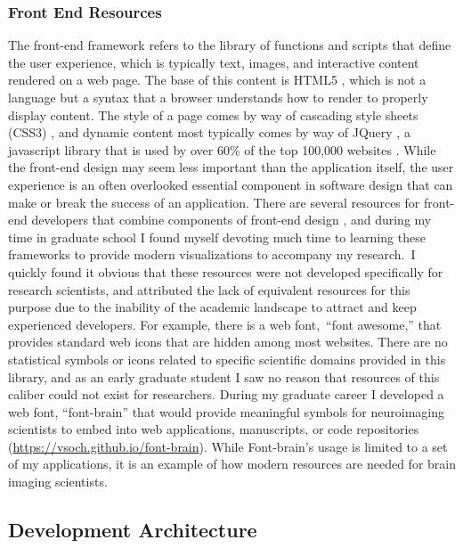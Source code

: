 \documentclass{report}
\begin{document}
\subsubsection{Front End Resources}

The front-end framework refers to the library of functions and scripts
that define the user experience, which is typically text, images, and
interactive content rendered on a web page. The base of this content is
HTML5 \cite{noauthor_undated-ov},
which is not a language but a syntax that a browser understands how to
render to properly display content. The style of a page comes by way of
cascading style sheets (CSS3) \cite{noauthor_undated-qj},
and dynamic content most typically comes by way of JQuery \cite{Foundation-jqueryorg_undated-ra},
a javascript library that is used by over 60\% of the top 100,000
websites \cite{Foundation-jqueryorg_undated-jc}.
While the front-end design may seem less important than the application
itself, the user experience is an often overlooked essential component
in software design that can make or break the success of an application.
There are several resources for front-end developers that combine
components of front-end design \cite{Gandy_undated-mp,noauthor_undated-yt,Mark_Otto_Jacob_Thornton_and_Bootstrap_contributors_undated-is},
and during my time in graduate school I found myself devoting much time
to learning these frameworks to provide modern visualizations to
accompany my research.~I quickly found it obvious that these resources
were not developed specifically for research scientists, and attributed
the lack of equivalent resources for this purpose due to the inability
of the academic landscape to attract and keep experienced developers.
For example, there is a web font,~``font awesome,'' that provides
standard web icons that are hidden among most websites. There are no
statistical symbols or icons related to specific scientific domains
provided in this library, and as an early graduate student I saw no
reason that resources of this caliber could not exist for researchers.
During my graduate career I developed a web font, ``font-brain'' that
would provide meaningful symbols for neuroimaging scientists to embed
into web applications, manuscripts, or code repositories
(\href{https://vsoch.github.io/font-brain}{https://vsoch.github.io/font-brain}). While Font-brain's usage is limited to a
set of my applications, it is an example of how modern resources are
needed for brain imaging scientists.

\subsection{Development Architecture}
\end{document}
